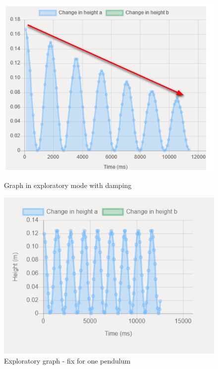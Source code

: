 \documentclass[onecolumn, draftclsnofoot,10pt, compsoc]{IEEEtran}
\begin{document}
\begin{figure}[!tbp]
  \centering
  \begin{minipage}[b]{0.4\textwidth}
      \includegraphics[width=\textwidth]{pictures_beta/damping_arrow.png}
      \caption{Graph in exploratory mode with damping}
      \label{fig:air_resistance1}
  \end{minipage}
  \hfill
  \begin{minipage}[b]{0.4\textwidth}
      \includegraphics[width=\textwidth]{pictures_beta/air_resistance_fix.png}
      \caption{Exploratory graph - fix for one pendulum}
      \label{fig:air_resistance_temp_fix}
  \end{minipage}
\end{figure}
\end{document}
